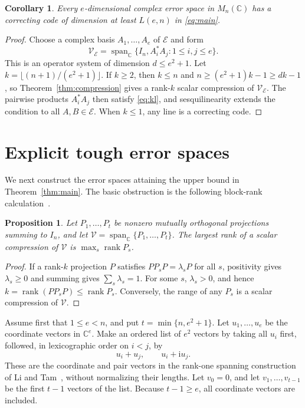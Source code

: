 \documentclass[11pt]{article}
\newcommand{\C}{\mathbb C}
\newcommand{\E}{\mathcal E}
\newcommand{\V}{\mathcal V}
\DeclareMathOperator{\rank}{rank}
\DeclareMathOperator{\Span}{span}
\newtheorem{proposition}[theorem]{Proposition}
\newtheorem{corollary}[theorem]{Corollary}
\theoremstyle{remark}
\numberwithin{equation}{section}
\begin{document}
\begin{corollary}\label{cor:lower}
Every $e$-dimensional complex error space in $M_n(\C)$ has a correcting
code of dimension at least $L(e,n)$ in \eqref{eq:main}.
\end{corollary}

\begin{proof}
Choose a complex basis $A_1,\ldots,A_e$ of $\E$ and form
\begin{equation}\label{eq:error-system}
 \V_{\E}=\Span_{\C}\{I_n,A_i^*A_j:1\le i,j\le e\}.
\end{equation}
This is an operator system of dimension $d\le e^2+1$.
Let $k=\lfloor(n+1)/(e^2+1)\rfloor$. If $k\ge2$, then
$k\le n$ and $n\ge(e^2+1)k-1\ge dk-1$, so
Theorem~\ref{thm:compression} gives a rank-$k$ scalar compression of
$\V_{\E}$. The pairwise products $A_i^*A_j$ then satisfy
\eqref{eq:kl}, and sesquilinearity extends the condition to all
$A,B\in\E$. When $k\le1$, any line is a correcting code.
\end{proof}

\section{Explicit tough error spaces}\label{sec:models}

We next construct the error spaces attaining the upper bound in
Theorem~\ref{thm:main}. The basic obstruction is the following
block-rank calculation~\cite[Proposition~2.1]{Weaver}.

\begin{proposition}\label{prop:blocks}
Let $P_1,\ldots,P_t$ be nonzero mutually orthogonal projections summing
to $I_n$, and let $\V=\Span_{\C}\{P_1,\ldots,P_t\}$. The largest
rank of a scalar compression of $\V$ is
$\max_s\rank P_s$.
\end{proposition}

\begin{proof}
If a rank-$k$ projection $P$ satisfies $PP_sP=\lambda_sP$ for all $s$,
positivity gives $\lambda_s\ge0$ and summing gives $\sum_s\lambda_s=1$.
For some $s$, $\lambda_s>0$, and hence
$k=\rank(PP_sP)\le\rank P_s$. Conversely, the range of any $P_s$
is a scalar compression of $\V$.
\end{proof}

Assume first that $1\le e<n$, and put $t=\min\{n,e^2+1\}$.
Let $u_1,\ldots,u_e$ be the coordinate vectors in $\C^e$. Make an
ordered list of $e^2$ vectors by taking all $u_i$ first, followed, in
lexicographic order on $i<j$, by
\begin{equation}\label{eq:labels}
 u_i+u_j,\qquad u_i+\mathrm{i}u_j.
\end{equation}
These are the coordinate and pair vectors in the rank-one spanning
construction of Li and Tam~\cite[Section~2.1]{LiTam}, without normalizing
their lengths. Let $v_0=0$, and let $v_1,\ldots,v_{t-1}$ be the first
$t-1$ vectors of the list. Because $t-1\ge e$, all coordinate vectors
are included.
\end{document}
